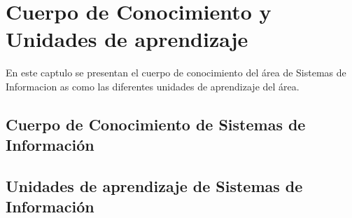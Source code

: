 \chapter{Cuerpo de Conocimiento y Unidades de aprendizaje}\label{chap:BOK}
En este cap­tulo se presentan el cuerpo de conocimiento del área de Sistemas de Informacion as­
como las diferentes unidades de aprendizaje del área.

\section{Cuerpo de Conocimiento de Sistemas de Información}
%
%


\section{Unidades de aprendizaje de Sistemas de Información}\label{sec:LU}




